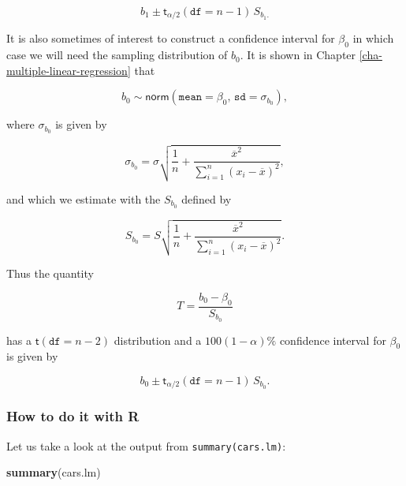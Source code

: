 \documentclass[]{book}
\newenvironment{Shaded}{\begin{snugshade}}{\end{snugshade}}
\newcommand{\KeywordTok}[1]{\textcolor[rgb]{0.13,0.29,0.53}{\textbf{{#1}}}}
\newcommand{\NormalTok}[1]{{#1}}
\numberwithin{equation}{chapter}
\numberwithin{figure}{chapter}
\theoremstyle{plain}
\theoremstyle{definition}
\theoremstyle{remark}
\theoremstyle{definition}
\theoremstyle{definition}
\theoremstyle{remark}
\begin{document}
\begin{equation}
b_{1}\pm\mathsf{t}_{\alpha/2}(\mathtt{df}=n-1)\, S_{b_{1}.}
\end{equation}

It is also sometimes of interest to construct a confidence interval for
\(\beta_{0}\) in which case we will need the sampling distribution of
\(b_{0}\). It is shown in Chapter \ref{cha-multiple-linear-regression}
that

\begin{equation}
b_{0}\sim\mathsf{norm}\left(\mathtt{mean}=\beta_{0},\,\mathtt{sd}=\sigma_{b_{0}}\right),
\end{equation}

where \(\sigma_{b_{0}}\) is given by

\begin{equation}
\sigma_{b_{0}}=\sigma\sqrt{\frac{1}{n}+\frac{\overline{x}^{2}}{\sum_{i=1}^{n}(x_{i}-\overline{x})^{2}}},
\end{equation}

and which we estimate with the \(S_{b_{0}}\) defined by

\begin{equation}
S_{b_{0}}=S\sqrt{\frac{1}{n}+\frac{\overline{x}^{2}}{\sum_{i=1}^{n}(x_{i}-\overline{x})^{2}}}.
\end{equation}

Thus the quantity

\begin{equation}
T=\frac{b_{0}-\beta_{0}}{S_{b_{0}}}
\end{equation}

has a \(\mathsf{t}(\mathtt{df}=n-2)\) distribution and a
\(100(1-\alpha)\%\) confidence interval for \(\beta_{0}\) is given by

\begin{equation}
b_{0}\pm\mathsf{t}_{\alpha/2}(\mathtt{df}=n-1)\, S_{b_{0}}.
\end{equation}

\subsubsection{How to do it with R}\label{how-to-do-it-with-r-50}

Let us take a look at the output from \texttt{summary(cars.lm)}:

\begin{Shaded}
\begin{Highlighting}[]
\KeywordTok{summary}\NormalTok{(cars.lm)}
\end{Highlighting}
\end{Shaded}
\end{document}

